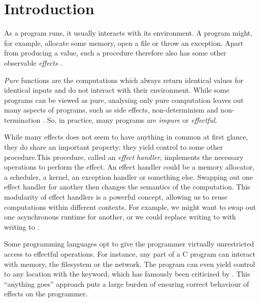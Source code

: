 \chapter{Introduction}\label{chap:introduction}

As a program runs, it usually interacts with its environment. A program might, for example, allocate some memory, open a file or throw an exception. Apart from producing a value, such a procedure therefore also has some other observable \emph{effects} \autocite{moggi_computational_1989}.

\emph{Pure} functions are the computations which always return identical values for identical inputs and do not interact with their environment. While some programs can be viewed as pure, analysing only pure computation leaves out many aspects of programs, such as side effects, non-determinism and non-termination \autocite{moggi_computational_1989}. So, in practice, many programs are \emph{impure} or \emph{effectful}.


While many effects does not seem to have anything in common at first glance, they do share an important property: they yield control to some other procedure.\citationneeded This procedure, called an \emph{effect handler}, implements the necessary operations to perform the effect. An effect handler could be a memory allocator, a scheduler, a kernel, an exception handler or something else. Swapping out one effect handler for another then changes the semantics of the computation. This modularity of effect handlers is a powerful concept, allowing us to reuse computations within different contexts. For example, we might want to swap out one asynchronous runtime for another, or we could replace writing to  with writing to .

Some programming languages opt to give the programmer virtually unrestricted access to effectful operations. For instance, any part of a C program can interact with memory, the filesystem or the network. The program can even yield control to any location with the  keyword, which has famously been criticized by \textcite{dijkstra_letters_1968}. This ``anything goes'' approach puts a large burden of ensuring correct behaviour of effects on the programmer.

